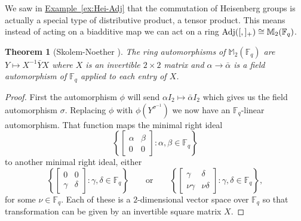 \documentclass[11pt]{article}
\numberwithin{equation}{section}
\theoremstyle{definition}
\theoremstyle{plain}
\newcommand{\expref}[2]{\hyperref[#2]{#1~\ref{#2}}}
\numberwithin{equation}{section}
\theoremstyle{plain}       %
\newtheorem{thm}[equation]{Theorem}
\theoremstyle{remark}
\theoremstyle{definition}
\numberwithin{figure}{section}
\numberwithin{table}{section}
\newcommand{\bbF}{\mathbb{F}}  %
\begin{document}
We saw in \expref{Example}{ex:Hei-Adj} that the commutation of Heisenberg groups is
actually a special type of distributive product, a tensor product.  This means
instead of acting on a biadditive map we can act on a ring ${\rm
Adj}([,]_+)\cong \mathbb{M}_2(\bbF_q)$.


\begin{thm}[Skolem-Noether {\cite[p. 237]{JacII}}] 
The ring automorphisms of $\mathbb{M}_2(\bbF_q)$ are $Y\mapsto X^{-1}\bar{Y}X$
where $X$ is an invertible $2\times 2$ matrix and $\alpha \to \bar{\alpha}$ is a
field automorphism of $\bbF_q$ applied to each entry of $X$.
\end{thm}
\begin{proof}
First the automorphism $\phi$ will send $\alpha I_2\mapsto \bar{\alpha}I_2$
which gives us the field automorphism $\sigma$.  Replacing $\phi$ with
$\phi(Y^{\sigma^{-1}})$ we now have an $\bbF_q$-linear automorphism.  That
function maps the minimal right ideal
\[
  \left\{\left[\begin{smallmatrix}\alpha &
        \beta \\ 0 & 0\end{smallmatrix}\right] : \alpha,\beta\in \bbF_q\right\}
\]
to
another minimal right ideal, either
\[
  \left\{\left[\begin{smallmatrix} 0 & 0 \\
      \gamma & \delta \end{smallmatrix}\right]: \gamma,\delta\in
  \bbF_q\right\} \qquad \text{or}
\qquad \left\{\left[\begin{smallmatrix}\gamma & \delta \\ \nu \gamma &
      \nu\delta\end{smallmatrix}\right]:\gamma,\delta\in
  \bbF_q\right\},
\]
for some $\nu\in \bbF_q$.  Each of these is a
$2$-dimensional vector space over $\bbF_q$ so that transformation can
be given by an invertible square matrix $X$.
\end{proof}
\end{document}
